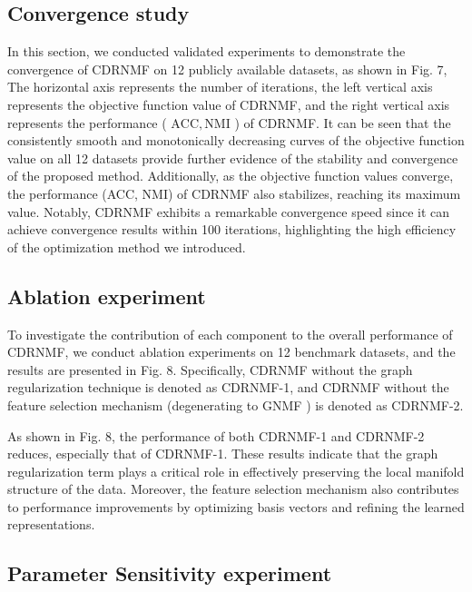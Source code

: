 \documentclass[a4paper,fleqn]{cas-sc}
\begin{document}
\subsection{Convergence study}

In this section, we conducted validated experiments to demonstrate the convergence of CDRNMF on 12 publicly available datasets, as shown in Fig. 7, The horizontal axis represents the number of iterations, the left vertical axis represents the objective function value of CDRNMF, and the right vertical axis represents the performance ( $\mathrm{ACC}, \mathrm{NMI}$ ) of CDRNMF. It can be seen that the consistently smooth and monotonically decreasing curves of the objective function value on all 12 datasets provide further evidence of the stability and convergence of the proposed method. Additionally, as the objective function values converge, the performance (ACC, NMI) of CDRNMF also stabilizes, reaching its maximum value. Notably, CDRNMF exhibits a remarkable convergence speed since it can achieve convergence results within 100 iterations, highlighting the high efficiency of the optimization method we introduced.


\subsection{Ablation experiment}

To investigate the contribution of each component to the overall performance of CDRNMF, we conduct ablation experiments on 12 benchmark datasets, and the results are presented in Fig. 8.
Specifically, CDRNMF without the graph regularization technique is denoted as CDRNMF-1, and CDRNMF without the feature selection mechanism (degenerating to GNMF \cite{19}) is denoted as CDRNMF-2.

As shown in Fig. 8, the performance of both CDRNMF-1 and CDRNMF-2 reduces, especially that of CDRNMF-1. These results indicate that the graph regularization term plays a critical role in effectively preserving the local manifold structure of the data. Moreover, the feature selection mechanism also contributes to performance improvements by optimizing basis vectors and refining the learned representations.



\subsection{Parameter Sensitivity experiment}
\end{document}
